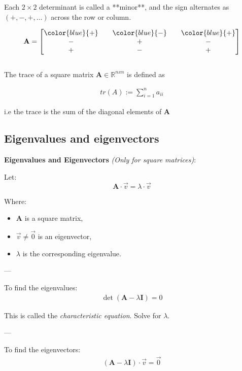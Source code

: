 Each \( 2 \times 2 \) determinant is called a **minor**, and the sign alternates as \( (+, -, +, \dots) \) across the row or column.

\begin{align*}
\textbf{A} = 
\begin{bmatrix}
\color{blue}{+} && \color{blue}{-} && \color{blue}{+} \\
- && + && - \\
+ && - && +
\end{bmatrix}
\end{align*}\\

The trace of a square matrix $\textbf{A} \in \mathbb{R}^{nxn}$ is defined as 

\begin{align*}
    tr(A) := \sum_{i=1}^{n}a_{ii}
\end{align*}

i.e the trace is the sum of the diagonal elements of $\textbf{A}$

\subsection{Eigenvalues and eigenvectors}

\textbf{Eigenvalues and Eigenvectors} \textit{(Only for square matrices)}:

Let:
\[
\textbf{A} \cdot \vec{v} = \lambda \cdot \vec{v}
\]

Where:
\begin{itemize}
    \item \(\textbf{A}\) is a square matrix,
    \item \(\vec{v} \neq \vec{0}\) is an eigenvector,
    \item \(\lambda\) is the corresponding eigenvalue.
\end{itemize}

---

To find the eigenvalues:
\begin{align*}
\det(\textbf{A} - \lambda \textbf{I}) = 0
\end{align*}

This is called the \textit{characteristic equation}. Solve for \(\lambda\).

---

To find the eigenvectors:
\begin{align*}
(\textbf{A} - \lambda \textbf{I}) \cdot \vec{v} = \vec{0}
\end{align*}

